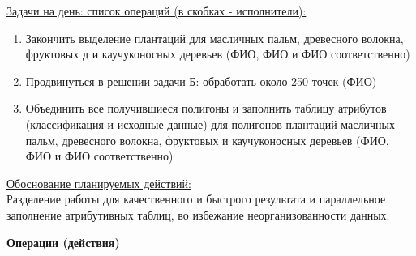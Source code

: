 \noindent\underline{Задачи на день: список операций (в скобках - исполнители):}

\begin{enumerate}
    \item Закончить выделение плантаций для масличных пальм, древесного волокна, фруктовых д и каучуконосных деревьев (ФИО, ФИО и ФИО соответственно)
    \item Продвинуться в решении задачи Б: обработать около 250 точек (ФИО)
    \item Объединить все получившиеся полигоны и заполнить таблицу атрибутов (классификация и исходные данные) для полигонов плантаций масличных пальм, древесного волокна, фруктовых и каучуконосных деревьев (ФИО, ФИО и ФИО соответственно)
\end{enumerate}

\noindent\underline{Обоснование планируемых действий:}\\
Разделение работы для качественного и быстрого результата и параллельное заполнение атрибутивных таблиц, во избежание неорганизованности данных.

\textbf{Операции (действия)}

